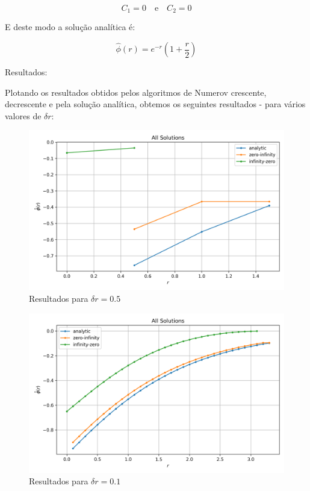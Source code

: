 \documentclass[12pt, a4paper]{article} %
\begin{document}
            \begin{equation*}
                C_{1} = 0 \quad \text{e} \quad C_{2} = 0
            \end{equation*}
            
            E deste modo a solu\c{c}\~ao anal\'itica \'e:

            \begin{equation*}
                \hat{\phi}(r) = e^{-r}\left(1 + \frac{r}{2}\right)
            \end{equation*}

        Resultados:

        Plotando os resultados obtidos pelos algoritmos de Numerov crescente, decrescente e pela solu\c{c}\~ao anal\'itica, obtemos os seguintes resultados - para v\'arios valores de $\delta r$:
        \begin{figure}[H]
            \centering
            \includegraphics[scale=0.7]{../images/all-plots-0.5.png}
            \caption{Resultados para $\delta r = 0.5$}
            \label{fig:all-plots-0.5}
        \end{figure}
        \begin{figure}[H]
            \centering
            \includegraphics[scale=0.7]{../images/all-plots-0.1.png}
            \caption{Resultados para $\delta r = 0.1$}
            \label{fig:all-plots-0.1}
        \end{figure}
\end{document}
